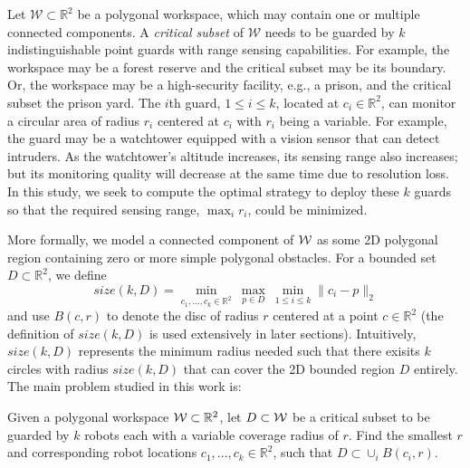 Let $\mathcal{W}\subset \mathbb{R}^2$ be a 
polygonal workspace, which may contain one or multiple connected components. 
A {\em critical subset} of $\mathcal{W}$ needs to be guarded by $k$ 
indistinguishable point guards with range sensing capabilities. For 
example, the workspace may be a forest reserve and the critical subset 
may be its boundary. Or, the workspace may be a high-security facility, 
e.g., a prison, and the critical subset the prison yard. The $i$th 
guard, $1\le i\le k$, located at $c_i \in \mathbb{R}^2$, can monitor a circular 
area of radius $r_i$ centered at $c_i$ with $r_i$ being a variable. For 
example, the guard may be a watchtower equipped with a vision sensor 
that can detect intruders. As the watchtower's altitude increases, 
its sensing range also increases; but its monitoring quality will 
decrease at the same time due to resolution loss. In this study, we seek 
to compute the optimal strategy to deploy these $k$ guards so that the 
required sensing range, $\max_i r_i$, could be minimized. 

More formally, we model a connected component of $\mathcal W$ as some 2D polygonal region
containing zero or more simple polygonal obstacles. 
For a bounded set $D \subset \mathbb{R}^2$, we define
\begin{equation*}
size(k, D) = \min_{c_1, \dots, c_k\in \mathbb{R}^2}\ \max_{p\in D}\ \min_{1\leq i\leq k} \lVert c_i - p \rVert_2 
\end{equation*}
and use $B(c, r)$ to denote the disc of radius $r$ centered at a point $c 
\in \mathbb{R}^2$ (the definition of $size(k, D)$ is used extensively in later 
sections). 
Intuitively, $size(k,D)$ represents the minimum radius needed such that there
exisits $k$ circles with radius $size(k, D)$ that can cover the 2D bounded region $D$ entirely.
The main problem studied in this work is:

\begin{problem}
Given a polygonal workspace $\mathcal W \subset \mathbb{R}^2$, let $D \subset \mathcal W$ be a 
critical subset to be guarded by $k$ robots each with a variable coverage radius of $r$. Find 
the smallest $r$ and corresponding robot locations $c_1, \dots, c_k\in \mathbb{R}^2$, such that $D \subset \cup_i B(c_i, r)$.
\end{problem}

